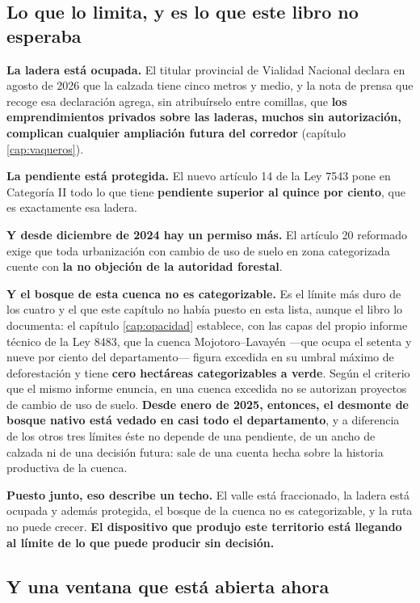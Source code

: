 \subsection*{Lo que lo limita, y es lo que este libro no esperaba}

\textbf{La ladera está ocupada.} El titular provincial de Vialidad Nacional declara en agosto de
2026 que la calzada tiene cinco metros y medio, y la nota de prensa que recoge esa declaración
agrega, sin atribuírselo entre comillas, que \textbf{los emprendimientos privados sobre
las laderas, muchos sin autorización, complican cualquier ampliación futura del corredor}
(capítulo \ref{cap:vaqueros}).

\textbf{La pendiente está protegida.} El nuevo artículo 14 de la Ley 7543 pone en Categoría II
todo lo que tiene \textbf{pendiente superior al quince por ciento}, que es exactamente esa
ladera.

\textbf{Y desde diciembre de 2024 hay un permiso más.} El artículo 20 reformado exige que toda
urbanización con cambio de uso de suelo en zona categorizada cuente con \textbf{la no objeción
de la autoridad forestal}.

\textbf{Y el bosque de esta cuenca no es categorizable.} Es el límite más duro de los cuatro y
el que este capítulo no había puesto en esta lista, aunque el libro lo documenta: el capítulo
\ref{cap:opacidad} establece, con las capas del propio informe técnico de la Ley 8483, que la
cuenca Mojotoro--Lavayén ---que ocupa el setenta y nueve por ciento del departamento--- figura
excedida en su umbral máximo de deforestación y tiene \textbf{cero hectáreas categorizables a
verde}. Según el criterio que el mismo informe enuncia, en una cuenca excedida no se autorizan
proyectos de cambio de uso de suelo. \textbf{Desde enero de 2025, entonces, el desmonte de bosque
nativo está vedado en casi todo el departamento}, y a diferencia de los otros tres límites éste
no depende de una pendiente, de un ancho de calzada ni de una decisión futura: sale de una
cuenta hecha sobre la historia productiva de la cuenca.

\textbf{Puesto junto, eso describe un techo.} El valle está fraccionado, la ladera está ocupada
y además protegida, el bosque de la cuenca no es categorizable, y la ruta no puede crecer. \textbf{El dispositivo que produjo este
territorio está llegando al límite de lo que puede producir sin decisión.}

\subsection*{Y una ventana que está abierta ahora}

